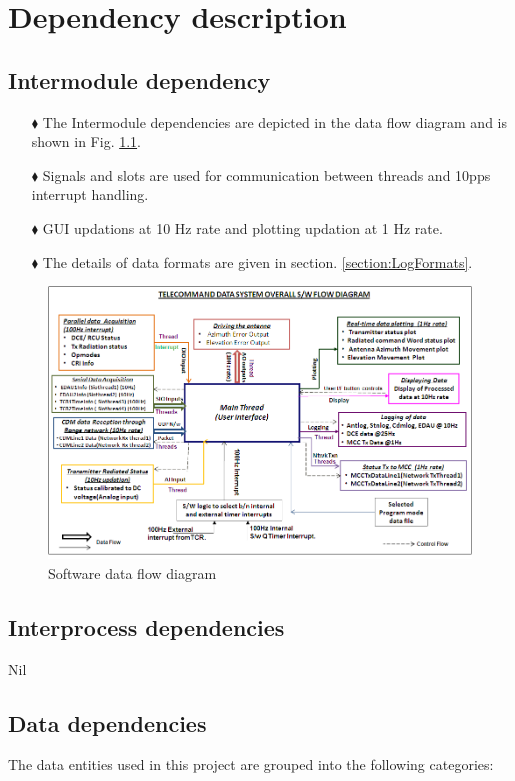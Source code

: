 \chapter{Dependency description}
\label{Chapter3}
\section{Intermodule dependency}

\begin{enumerate}
	\item [$\blacklozenge$] The Intermodule dependencies are depicted in the data flow diagram and is shown in  Fig. \ref{FIG:SWDataFlowDiag}.
	\item [$\blacklozenge$] Signals and slots are used for communication between threads and 10pps interrupt handling.
	\item [$\blacklozenge$] GUI updations at 10 Hz rate and plotting updation at 1 Hz rate.
	\item [$\blacklozenge$] The details of data formats are given in section. \ref{section:LogFormats}.
\end{enumerate}

\begin{figure}[H]
	\centering
	\includegraphics[width=\linewidth]{./Diagrams/SWFlowDiag.png}
	\caption{Software data flow diagram}
	\label{FIG:SWDataFlowDiag}
\end{figure}

\section{Interprocess dependencies}
Nil
\section{Data dependencies}
The data entities used in this project are grouped into the following categories:
